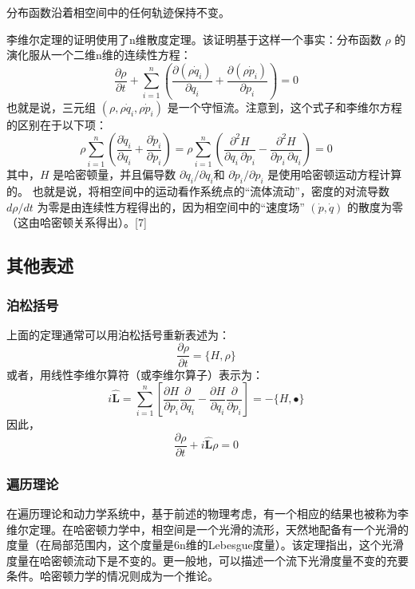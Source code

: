 分布函数沿着相空间中的任何轨迹保持不变。  

李维尔定理的证明使用了n维散度定理。该证明基于这样一个事实：分布函数 \(\rho\) 的演化服从一个二维n维的连续性方程：
\[
\frac{\partial \rho}{\partial t} + \sum_{i=1}^{n} \left( \frac{\partial (\rho \dot{q}_i)}{\partial q_i} + \frac{\partial (\rho \dot{p}_i)}{\partial p_i} \right) = 0~
\]
也就是说，三元组 \((\rho, \rho \dot{q}_i, \rho \dot{p}_i)\) 是一个守恒流。注意到，这个式子和李维尔方程的区别在于以下项：
\[
\rho \sum_{i=1}^{n} \left( \frac{\partial \dot{q}_i}{\partial q_i} + \frac{\partial \dot{p}_i}{\partial p_i} \right) = \rho \sum_{i=1}^{n} \left( \frac{\partial^2 H}{\partial q_i \, \partial p_i} - \frac{\partial^2 H}{\partial p_i \, \partial q_i} \right) = 0~
\]
其中，\( H \) 是哈密顿量，并且偏导数 \(\partial \dot{q}_i/\partial q_i\)和 \(\partial \dot{p}_i/\partial p_i\) 是使用哈密顿运动方程计算的。  
也就是说，将相空间中的运动看作系统点的“流体流动”，密度的对流导数 \(d\rho/dt\) 为零是由连续性方程得出的，因为相空间中的“速度场” \((\dot{p}, \dot{q})\) 的散度为零（这由哈密顿关系得出）。[7]
\subsection{其他表述}  
\subsubsection{泊松括号}  
上面的定理通常可以用泊松括号重新表述为：
\[
\frac{\partial \rho}{\partial t} = \{ H, \rho \}~
\]
或者，用线性李维尔算符（或李维尔算子）表示为：
\[
i \hat{\mathbf{L}} = \sum_{i=1}^{n} \left[ \frac{\partial H}{\partial p_i} \frac{\partial}{\partial q_i} - \frac{\partial H}{\partial q_i} \frac{\partial}{\partial p_i} \right] = -\{ H, \bullet \}~
\]
因此，
\[
\frac{\partial \rho}{\partial t} + i \hat{\mathbf{L}} \rho = 0~
\]
\subsubsection{遍历理论}  
在遍历理论和动力学系统中，基于前述的物理考虑，有一个相应的结果也被称为李维尔定理。在哈密顿力学中，相空间是一个光滑的流形，天然地配备有一个光滑的度量（在局部范围内，这个度量是6n维的Lebesgue度量）。该定理指出，这个光滑度量在哈密顿流动下是不变的。更一般地，可以描述一个流下光滑度量不变的充要条件。哈密顿力学的情况则成为一个推论。
